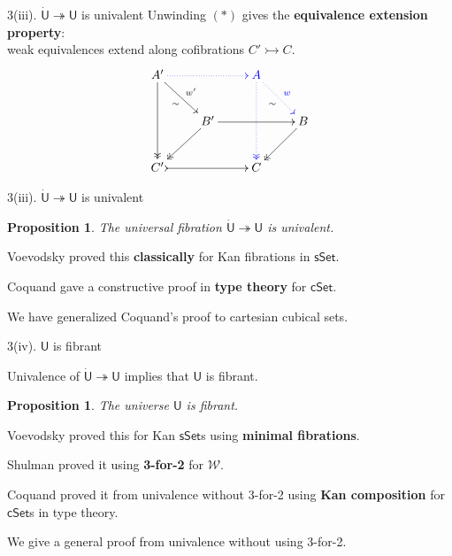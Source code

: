 \documentclass[handout]{beamer}
\newcommand{\myemph}[1]{\textbf{#1}}    %
\newcommand{\cSet}{\ensuremath{\mathsf{cSet}}}
\newcommand{\sSet}{\ensuremath{\mathsf{sSet}}}
\newcommand{\mc}[1]{\ensuremath{\mathcal{#1}}}
\newcommand{\mono}{\rightarrowtail}
\renewcommand{\epi}{\twoheadrightarrow}
\newcommand{\U}{\mathsf{U}}
\newcommand{\UU}{\dot{\mathsf{U}}}
\newtheorem{proposition}[theorem]{Proposition}
\theoremstyle{remark}
\begin{document}
\begin{frame}{3(iii). $\UU\epi\U$ is univalent}
Unwinding $(*)$ gives the \myemph{equivalence extension property}:\\
weak equivalences extend along cofibrations $C' \mono C$.
\[
\xymatrix{
A' \ar@{->>}[dd] \ar[rd]_{\sim}^{w'} \ar@[blue]@{..>}[rr] 
	&& {\color{blue}A}  \ar@[blue]@{..>>}[dd] \ar@[blue]@{..>}[rd]_{\sim}^{\color{blue}w} \\
& B' \ar@{->>}[ld] \ar[rr]  && B  \ar@{->>}[ld] \\
C' \ar@{>->}[rr] && C
}
\]

\end{frame}
\begin{frame}{3(iii). $\UU\epi\U$ is univalent}


\begin{proposition}
The universal  fibration $\UU\epi\U$ is univalent.
\end{proposition}
\bigskip
\pause

Voevodsky proved this \myemph{classically} for Kan fibrations in $\sSet$.
\medskip

Coquand gave a constructive proof in \myemph{type theory} for $\cSet$.
\medskip

We have generalized Coquand's proof to cartesian cubical sets.

\end{frame}
\begin{frame}{3(iv). $\U$ is fibrant}

Univalence of $\UU\epi \U$ implies that $\U$ is fibrant.

\begin{proposition}
The universe $\U$ is fibrant.
\end{proposition}
\bigskip
\pause

Voevodsky proved this for Kan $\sSet$s using \myemph{minimal fibrations}.
\medskip

Shulman proved it using \myemph{3-for-2} for $\mc{W}$. 
\medskip

Coquand proved it from univalence without 3-for-2 using \myemph{Kan composition} for $\cSet$s in type theory.
\medskip

We give a general proof from univalence without using 3-for-2.

\end{frame}
\end{document}
